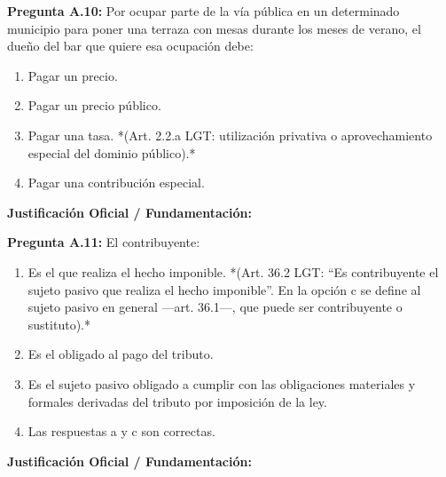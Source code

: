 \documentclass[11pt,a4paper,openany]{article}
\begin{document}
\noindent\textbf{\sffamily Pregunta A.10:} Por ocupar parte de la vía pública en un determinado municipio para poner una terraza con mesas durante los meses de verano, el dueño del bar que quiere esa ocupación debe:\\[0.15cm]
\begin{enumerate}[label=\textbf{\alph*)},leftmargin=1.8em,itemsep=1.5pt,topsep=2pt,partopsep=0pt,parsep=0pt]
    \item Pagar un precio.
    \item Pagar un precio público.
    \item Pagar una tasa. *(Art. 2.2.a LGT: utilización privativa o aprovechamiento especial del dominio público).*
    \item Pagar una contribución especial.
\end{enumerate}
\begin{solucionBox}
\textbf{Justificación Oficial / Fundamentación:}\\[0.1cm]

\end{solucionBox}
\vspace{0.35cm}

\noindent\textbf{\sffamily Pregunta A.11:} El contribuyente:\\[0.15cm]
\begin{enumerate}[label=\textbf{\alph*)},leftmargin=1.8em,itemsep=1.5pt,topsep=2pt,partopsep=0pt,parsep=0pt]
    \item Es el que realiza el hecho imponible. *(Art. 36.2 LGT: ``Es contribuyente el sujeto pasivo que realiza el hecho imponible''. En la opción c se define al sujeto pasivo en general —art. 36.1—, que puede ser contribuyente o sustituto).*
    \item Es el obligado al pago del tributo.
    \item Es el sujeto pasivo obligado a cumplir con las obligaciones materiales y formales derivadas del tributo por imposición de la ley.
    \item Las respuestas a y c son correctas.
\end{enumerate}
\begin{solucionBox}
\textbf{Justificación Oficial / Fundamentación:}\\[0.1cm]

\end{solucionBox}
\vspace{0.35cm}
\end{document}
